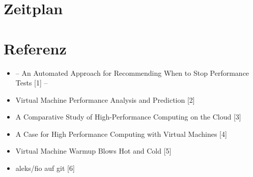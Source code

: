 \documentclass{article}
\begin{document}
\section{Zeitplan}
\section{Referenz}
\begin{itemize}
    \item -- An Automated Approach for Recommending When to Stop Performance Tests [1] --
    \item Virtual Machine Performance Analysis and Prediction [2]
    \item A Comparative Study of High-Performance Computing on the Cloud [3]
    \item A Case for High Performance Computing with Virtual Machines [4]
    \item Virtual Machine Warmup Blows Hot and Cold [5]
    \item aleks/fio auf git [6]
\end{itemize}
\end{document}
